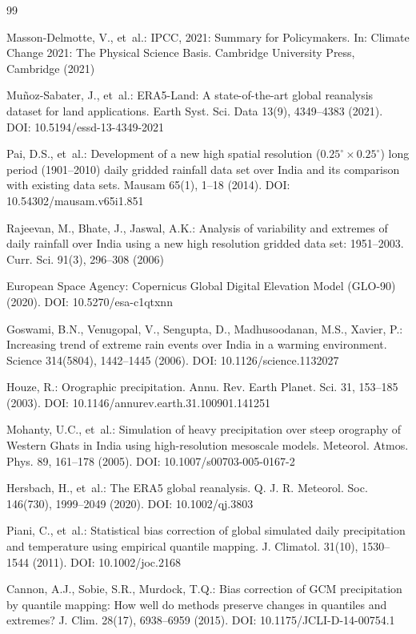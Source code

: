 \documentclass[pdflatex,sn-mathphys,Numbered]{sn-jnl}
\begin{document}
\begin{thebibliography}{99}

Masson-Delmotte, V., et~al.: IPCC, 2021: Summary for Policymakers. In: Climate Change 2021: The Physical Science Basis. Cambridge University Press, Cambridge (2021)

Mu{\~n}oz-Sabater, J., et~al.: ERA5-Land: A state-of-the-art global reanalysis dataset for land applications. Earth Syst. Sci. Data 13(9), 4349--4383 (2021). DOI: 10.5194/essd-13-4349-2021

Pai, D.S., et~al.: Development of a new high spatial resolution ($0.25^\circ \times 0.25^\circ$) long period (1901--2010) daily gridded rainfall data set over India and its comparison with existing data sets. Mausam 65(1), 1--18 (2014). DOI: 10.54302/mausam.v65i1.851

Rajeevan, M., Bhate, J., Jaswal, A.K.: Analysis of variability and extremes of daily rainfall over India using a new high resolution gridded data set: 1951--2003. Curr. Sci. 91(3), 296--308 (2006)

European Space Agency: Copernicus Global Digital Elevation Model (GLO-90) (2020). DOI: 10.5270/esa-c1qtxnn

Goswami, B.N., Venugopal, V., Sengupta, D., Madhusoodanan, M.S., Xavier, P.: Increasing trend of extreme rain events over India in a warming environment. Science 314(5804), 1442--1445 (2006). DOI: 10.1126/science.1132027

Houze, R.: Orographic precipitation. Annu. Rev. Earth Planet. Sci. 31, 153--185 (2003). DOI: 10.1146/annurev.earth.31.100901.141251

Mohanty, U.C., et~al.: Simulation of heavy precipitation over steep orography of Western Ghats in India using high-resolution mesoscale models. Meteorol. Atmos. Phys. 89, 161--178 (2005). DOI: 10.1007/s00703-005-0167-2

Hersbach, H., et~al.: The ERA5 global reanalysis. Q. J. R. Meteorol. Soc. 146(730), 1999--2049 (2020). DOI: 10.1002/qj.3803

Piani, C., et~al.: Statistical bias correction of global simulated daily precipitation and temperature using empirical quantile mapping. J. Climatol. 31(10), 1530--1544 (2011). DOI: 10.1002/joc.2168

Cannon, A.J., Sobie, S.R., Murdock, T.Q.: Bias correction of GCM precipitation by quantile mapping: How well do methods preserve changes in quantiles and extremes? J. Clim. 28(17), 6938--6959 (2015). DOI: 10.1175/JCLI-D-14-00754.1


\end{thebibliography}
\end{document}
